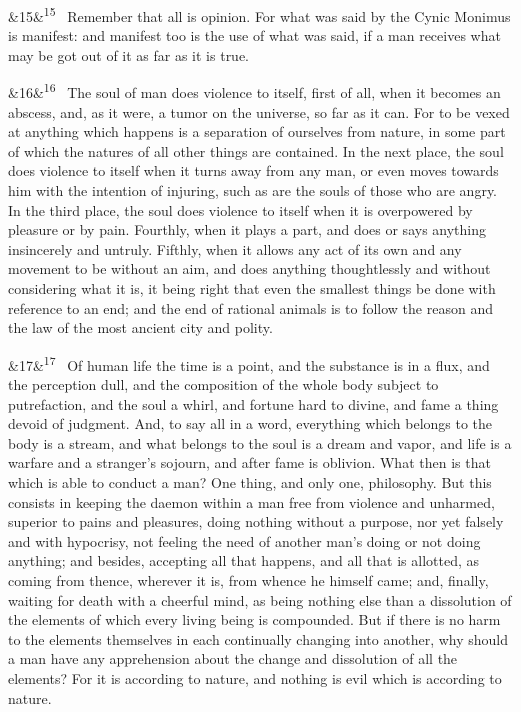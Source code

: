 \documentclass[12pt]{article}
\newcommand{\para}[1][]{\par\noindent\ifx&#1&\else\textsuperscript{\footnotesize #1}~\fi}
\begin{document}
\para[15] Remember that all is opinion. For what was said by the Cynic Monimus
is manifest: and manifest too is the use of what was said, if a man
receives what may be got out of it as far as it is true.

\para[16] The soul of man does violence to itself, first of all, when it
becomes an abscess, and, as it were, a tumor on the universe, so far as
it can. For to be vexed at anything which happens is a separation of
ourselves from nature, in some part of which the natures of all other
things are contained. In the next place, the soul does violence to
itself when it turns away from any man, or even moves towards him with
the intention of injuring, such as are the souls of those who are angry.
In the third place, the soul does violence to itself when it is
overpowered by pleasure or by pain. Fourthly, when it plays a part, and
does or says anything insincerely and untruly. Fifthly, when it allows
any act of its own and any movement to be without an aim, and does
anything thoughtlessly and without considering what it is, it being
right that even the smallest things be done with reference to an end;
and the end of rational animals is to follow the reason and the law of
the most ancient city and polity.

\para[17] Of human life the time is a point, and the substance is in a flux,
and the perception dull, and the composition of the whole body subject
to putrefaction, and the soul a whirl, and fortune hard to divine, and
fame a thing devoid of judgment. And, to say all in a word, everything
which belongs to the body is a stream, and what belongs to the soul is a
dream and vapor, and life is a warfare and a stranger's sojourn, and
after fame is oblivion. What then is that which is able to conduct a
man? One thing, and only one, philosophy. But this consists in keeping
the daemon within a man free from violence and unharmed, superior to
pains and pleasures, doing nothing without a purpose, nor yet falsely
and with hypocrisy, not feeling the need of another man's doing or not
doing anything; and besides, accepting all that happens, and all that
is allotted, as coming from thence, wherever it is, from whence he
himself came; and, finally, waiting for death with a cheerful mind, as
being nothing else than a dissolution of the elements of which every
living being is compounded. But if there is no harm to the elements
themselves in each continually changing into another, why should a man
have any apprehension about the change and dissolution of all the
elements? For it is according to nature, and nothing is evil which is
according to nature.
\end{document}
